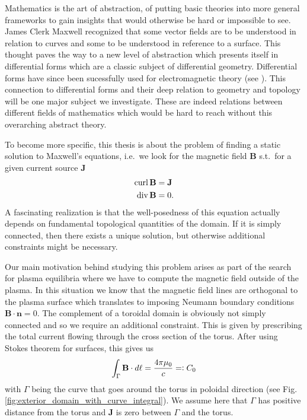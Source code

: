 \documentclass[../master_thesis.tex]{subfiles}
\begin{document}
Mathematics is the art of abstraction, of putting basic theories into more 
general frameworks to gain insights that would otherwise be hard or 
impossible to see. James Clerk Maxwell recognized that some
vector fields are to be understood in relation to curves 
and some to be understood in reference to a surface. 
This thought paves the way to a new level of abstraction
which presents itself in differential forms which are a classic 
subject of differential geometry. Differential forms have since been sucessfully
used for electromagnetic theory (see \cite{differential_forms_electromagnetism}).
This connection to differential forms and their deep relation to geometry and topology
will be one major subject we investigate. These are indeed relations between different 
fields of mathematics which would be hard to reach without this overarching abstract theory.

To become more specific, this thesis is about the problem of finding a static solution to Maxwell's equations,
i.e.~we look for the magnetic field $\mathbf{B}$ s.t.~for a given current source 
$\mathbf{J}$ 
\begin{align*}
    \operatorname{curl} \mathbf{B} &= \mathbf{J} 
    \\ \operatorname{div} \mathbf{B} &= 0.
\end{align*}
A fascinating realization is that the well-posedness of this equation actually 
depends on fundamental topological quantities of the domain. If it is simply 
connected, then there exists a unique solution, but otherwise additional constraints 
might be necessary.

Our main motivation behind studying this problem arises as part of the search for plasma equilibria where we have to 
compute the magnetic field outside of the plasma.
In this situation we know that the magnetic field lines are orthogonal to the plasma surface
which translates to imposing Neumann boundary conditions 
$\mathbf{B} \cdot \mathbf{n} = 0$. The complement of a toroidal domain is obviously not simply connected and so 
we require an additional constraint. This is given by prescribing the total 
current flowing through the cross section of the torus. After using Stokes theorem 
for surfaces, this gives us 
\begin{align*}
    \int_\Gamma \mathbf{B}\cdot d\ell = \frac{4 \pi \mu_0}{c} =\vcentcolon C_0
\end{align*}
with $\Gamma$ being the curve that goes around the torus 
in poloidal direction (see Fig.\,\ref{fig:exterior_domain_with_curve_integral}). 
We assume here that $\Gamma$ has positive distance from the torus and 
$\mathbf{J}$ is zero between $\Gamma$ and the torus.
\end{document}
